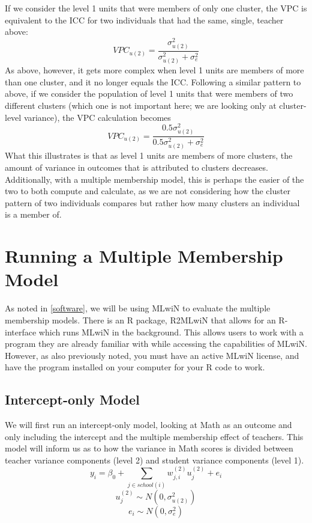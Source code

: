 \documentclass[
]{book}
\begin{document}
If we consider the level 1 units that were members of only one cluster, the VPC is equivalent to the ICC for two individuals that had the same, single, teacher above:\\
\[VPC_{u(2)} = \frac{\sigma_{u(2)}^{2}}{\sigma_{u(2)}^{2} + \sigma_{e}^{2}}\]
As above, however, it gets more complex when level 1 units are members of more than one cluster, and it no longer equals the ICC. Following a similar pattern to above, if we consider the population of level 1 units that were members of two different clusters (which one is not important here; we are looking only at cluster-level variance), the VPC calculation becomes
\[VPC_{u(2)} = \frac{0.5\sigma_{u(2)}^{2}}{0.5\sigma_{u(2)}^{2} + \sigma_{e}^{2}}\]
What this illustrates is that as level 1 units are members of more clusters, the amount of variance in outcomes that is attributed to clusters decreases. Additionally, with a multiple membership model, this is perhaps the easier of the two to both compute and calculate, as we are not considering how the cluster pattern of two individuals compares but rather how many clusters an individual is a member of.

\hypertarget{running-a-multiple-membership-model}{%
\chapter{Running a Multiple Membership Model}\label{running-a-multiple-membership-model}}

As noted in \ref{software}, we will be using MLwiN to evaluate the multiple membership models. There is an R package, R2MLwiN \citep{R-R2MLwiN} that allows for an R-interface which runs MLwiN in the background. This allows users to work with a program they are already familiar with while accessing the capabilities of MLwiN. However, as also previously noted, you must have an active MLwiN license, and have the program installed on your computer for your R code to work.

\hypertarget{intercept-only-model}{%
\section{Intercept-only Model}\label{intercept-only-model}}

We will first run an intercept-only model, looking at Math as an outcome and only including the intercept and the multiple membership effect of teachers. This model will inform us as to how the variance in Math scores is divided between teacher variance components (level 2) and student variance components (level 1).\\
\[y_{i} = \beta_{0} + \sum_{j \in school(i)}w_{j,i}^{(2)}u_{j}^{(2)} + e_{i}\]
\[u_{j}^{(2)} \sim N(0, \sigma_{u(2)}^{2})\]
\[e_{i} \sim N(0, \sigma_{e}^{2})\]
\end{document}
